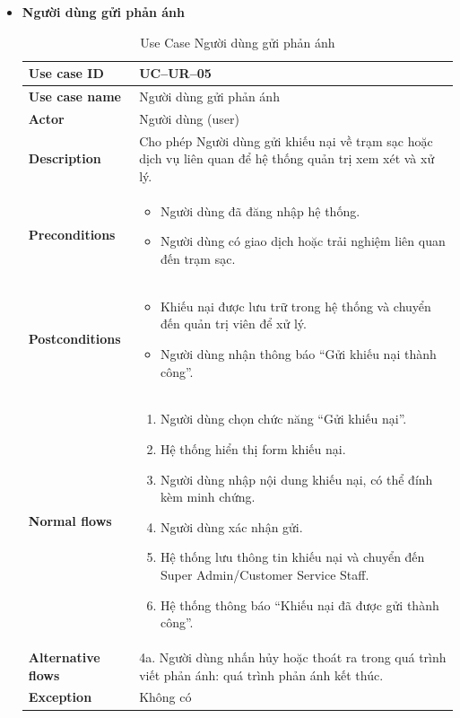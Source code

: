 \begin{itemize}
\item \textbf{Người dùng gửi phản ánh}
\begin{longtable}{|m{}|m{}|}
          \caption{Use Case Người dùng gửi phản ánh} \\
  \hline
  \textbf{Use case ID} & UC--UR--05 \\
  \hline
  \textbf{Use case name} & Người dùng gửi phản ánh \\
  \hline
  \textbf{Actor} & Người dùng (user) \\
  \hline
  \textbf{Description} & Cho phép Người dùng gửi khiếu nại về trạm sạc hoặc dịch vụ liên quan để hệ thống quản trị xem xét và xử lý. \\
  \hline
  \textbf{Preconditions} &
  \begin{itemize}
    \item Người dùng đã đăng nhập hệ thống.
    \item Người dùng có giao dịch hoặc trải nghiệm liên quan đến trạm sạc.
  \end{itemize}\\
  \hline
  \textbf{Postconditions} &
  \begin{itemize}
    \item Khiếu nại được lưu trữ trong hệ thống và chuyển đến quản trị viên để xử lý.
    \item Người dùng nhận thông báo “Gửi khiếu nại thành công”.
  \end{itemize}\\
  \hline
  \textbf{Normal flows} &
  \begin{enumerate}[label=\arabic*.]
    \item Người dùng chọn chức năng “Gửi khiếu nại”.
    \item Hệ thống hiển thị form khiếu nại.
    \item Người dùng nhập nội dung khiếu nại, có thể đính kèm minh chứng.
    \item Người dùng xác nhận gửi.
    \item Hệ thống lưu thông tin khiếu nại và chuyển đến Super Admin/Customer Service Staff.
    \item Hệ thống thông báo “Khiếu nại đã được gửi thành công”.
  \end{enumerate}\\
  \hline
  \textbf{Alternative flows} &
  4a. Người dùng nhấn hủy hoặc thoát ra trong quá trình viết phản ánh: quá trình phản ánh kết thúc.\\
  \hline
  \textbf{Exception} & Không có\\
  \hline
  \end{longtable}


\end{itemize}
